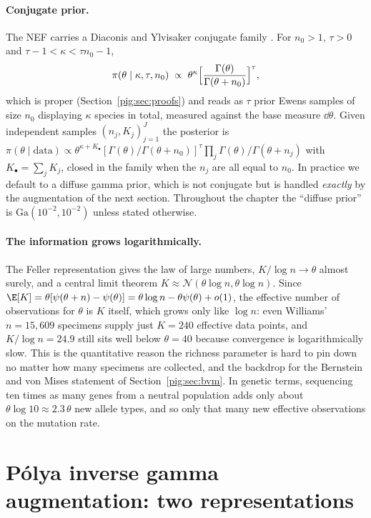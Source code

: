 \paragraph{Conjugate prior.} The NEF carries a Diaconis and Ylvisaker conjugate family \citep{pig:diaconis1979}. For $n_0>1$, $\tau>0$ and $\tau-1<\kappa<\tau n_0-1$,
\begin{equation}\label{pig:eq:conj}
\pi(\theta\mid\kappa,\tau,n_0)\;\propto\;\theta^{\kappa}\Bigl[\frac{\Gamma(\theta)}{\Gamma(\theta+n_0)}\Bigr]^{\tau},
\end{equation}
which is proper (Section~\ref{pig:sec:proofs}) and reads as $\tau$ prior Ewens samples of size $n_0$ displaying $\kappa$ species in total, measured against the base measure $\dd\theta$. Given independent samples $(n_j,K_j)_{j=1}^{J}$ the posterior is $\pi(\theta\mid\text{data})\propto\theta^{\kappa+K_\bullet}[\Gamma(\theta)/\Gamma(\theta+n_0)]^{\tau}\prod_j\Gamma(\theta)/\Gamma(\theta+n_j)$ with $K_\bullet=\sum_j K_j$, closed in the family when the $n_j$ are all equal to $n_0$. In practice we default to a diffuse gamma prior, which is not conjugate but is handled \emph{exactly} by the augmentation of the next section. Throughout the chapter the ``diffuse prior'' is $\mathrm{Ga}(10^{-2},10^{-2})$ unless stated otherwise.

\paragraph{The information grows logarithmically.} The Feller representation gives the \citet{pig:korwar1973} law of large numbers, $K/\log n\to\theta$ almost surely, and a central limit theorem $K\approx\mathcal{N}(\theta\log n,\theta\log n)$. Since $\E[K]=\theta[\psi(\theta+n)-\psi(\theta)]=\theta\log n-\theta\psi(\theta)+o(1)$, the effective number of observations for $\theta$ is $K$ itself, which grows only like $\log n$: even Williams' $n=15{,}609$ specimens supply just $K=240$ effective data points, and $K/\log n=24.9$ still sits well below $\theta=40$ because convergence is logarithmically slow. This is the quantitative reason the richness parameter is hard to pin down no matter how many specimens are collected, and the backdrop for the Bernstein and von Mises statement of Section~\ref{pig:sec:bvm}. In genetic terms, sequencing ten times as many genes from a neutral population adds only about $\theta\log10\approx2.3\,\theta$ new allele types, and so only that many new effective observations on the mutation rate.

\section{P\'olya inverse gamma augmentation: two representations}\label{pig:sec:pig}

